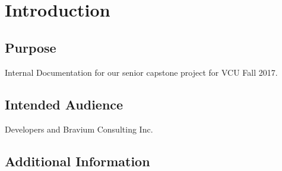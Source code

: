 \documentclass[10pt]{article}
\title{
\vspace{2in}
\textmd{\textbf{\projecttitle} \\}
\vspace{5in}
}
\author{\textbf{\hmwkAuthorName}}
\date{} %
\begin{document}
\maketitle








\newpage

\tableofcontents

\newpage













\section{Introduction}

\subsection{Purpose}

Internal Documentation for our senior capstone project for VCU Fall 2017. 



\subsection{Intended Audience}

Developers and Bravium Consulting Inc.

\subsection{Additional Information}
\end{document}
